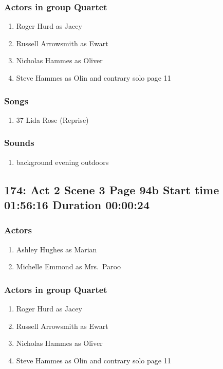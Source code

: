 \subsubsection{Actors in group Quartet}
\begin{enumerate}
\item Roger Hurd as Jacey
\item Russell Arrowsmith as Ewart
\item Nicholas Hammes as Oliver
\item Steve Hammes as Olin and contrary solo page 11
\end{enumerate}

\subsubsection{Songs}
\begin{enumerate}
\item 37 Lida Rose (Reprise)
\end{enumerate}\subsubsection{Sounds}
\begin{enumerate}
\item background evening outdoors
\end{enumerate}
\subsection{174: Act 2 Scene 3 Page 94b Start time 01:56:16 Duration 00:00:24}

\subsubsection{Actors}
\begin{enumerate}
\item Ashley Hughes as Marian
\item Michelle Emmond as Mrs.~Paroo
\end{enumerate}
\subsubsection{Actors in group Quartet}
\begin{enumerate}
\item Roger Hurd as Jacey
\item Russell Arrowsmith as Ewart
\item Nicholas Hammes as Oliver
\item Steve Hammes as Olin and contrary solo page 11
\end{enumerate}

